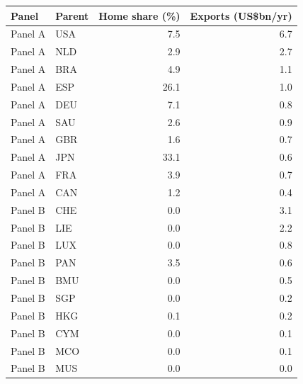 \begin{tabular}{llrr}
\toprule
Panel & Parent & Home share (\%) & Exports (US\$bn/yr) \\
\midrule
Panel A & USA & 7.5 & 6.7 \\
Panel A & NLD & 2.9 & 2.7 \\
Panel A & BRA & 4.9 & 1.1 \\
Panel A & ESP & 26.1 & 1.0 \\
Panel A & DEU & 7.1 & 0.8 \\
Panel A & SAU & 2.6 & 0.9 \\
Panel A & GBR & 1.6 & 0.7 \\
Panel A & JPN & 33.1 & 0.6 \\
Panel A & FRA & 3.9 & 0.7 \\
Panel A & CAN & 1.2 & 0.4 \\
\midrule
Panel B & CHE & 0.0 & 3.1 \\
Panel B & LIE & 0.0 & 2.2 \\
Panel B & LUX & 0.0 & 0.8 \\
Panel B & PAN & 3.5 & 0.6 \\
Panel B & BMU & 0.0 & 0.5 \\
Panel B & SGP & 0.0 & 0.2 \\
Panel B & HKG & 0.1 & 0.2 \\
Panel B & CYM & 0.0 & 0.1 \\
Panel B & MCO & 0.0 & 0.1 \\
Panel B & MUS & 0.0 & 0.0 \\
\bottomrule
\end{tabular}
